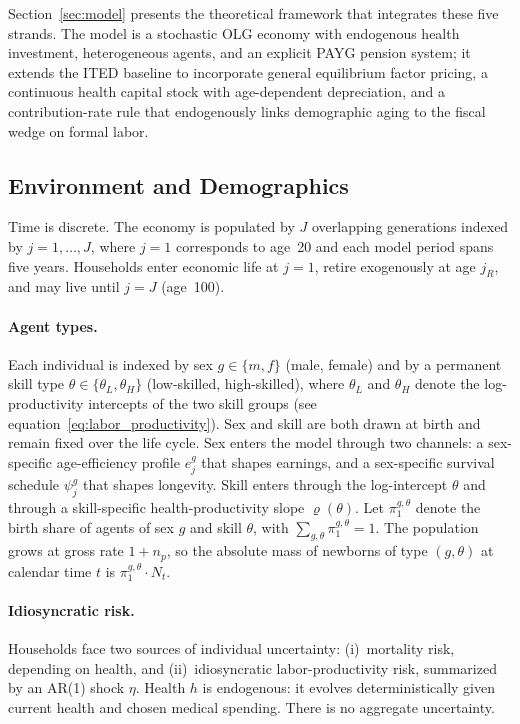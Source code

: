 \documentclass[12pt,a4paper]{article}
\begin{document}
Section~\ref{sec:model} presents the theoretical framework that integrates these five strands. The model is a stochastic OLG economy with endogenous health investment, heterogeneous agents, and an explicit PAYG pension system; it extends the ITED baseline \citep{CortesEtAl2024} to incorporate general equilibrium factor pricing, a continuous health capital stock with age-dependent depreciation, and a contribution-rate rule that endogenously links demographic aging to the fiscal wedge on formal labor.
\subsection{Environment and Demographics}
\label{subsec:environment}

Time is discrete. The economy is populated by $J$ overlapping generations indexed by $j = 1, \ldots, J$, where $j = 1$ corresponds to age~20 and each model period spans five years. Households enter economic life at $j = 1$, retire exogenously at age $j_R$, and may live until $j = J$ (age~100).

\paragraph{Agent types.}
Each individual is indexed by sex $g \in \{m, f\}$ (male, female) and by a permanent skill type $\theta \in \{\theta_L, \theta_H\}$ (low-skilled, high-skilled), where $\theta_L$ and $\theta_H$ denote the log-productivity intercepts of the two skill groups (see equation~\eqref{eq:labor_productivity}). Sex and skill are both drawn at birth and remain fixed over the life cycle. Sex enters the model through two channels: a sex-specific age-efficiency profile $e^g_j$ that shapes earnings, and a sex-specific survival schedule $\psi^g_j$ that shapes longevity. Skill enters through the log-intercept $\theta$ and through a skill-specific health-productivity slope $\varrho(\theta)$. Let $\pi^{g,\theta}_1$ denote the birth share of agents of sex $g$ and skill $\theta$, with $\sum_{g,\theta} \pi^{g,\theta}_1 = 1$. The population grows at gross rate $1 + n_p$, so the absolute mass of newborns of type $(g,\theta)$ at calendar time $t$ is $\pi^{g,\theta}_1 \cdot N_t$.

\paragraph{Idiosyncratic risk.}
Households face two sources of individual uncertainty: (i)~mortality risk, depending on health, and (ii)~idiosyncratic labor-productivity risk, summarized by an AR(1) shock $\eta$. Health $h$ is endogenous: it evolves deterministically given current health and chosen medical spending. There is no aggregate uncertainty.
\end{document}
